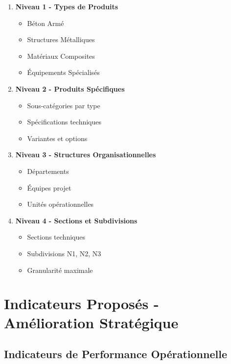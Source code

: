 \documentclass[12pt,a4paper]{article}
\begin{document}
\begin{enumerate}
    \item \textbf{Niveau 1 - Types de Produits}
    \begin{itemize}
        \item Béton Armé
        \item Structures Métalliques
        \item Matériaux Composites
        \item Équipements Spécialisés
    \end{itemize}
    
    \item \textbf{Niveau 2 - Produits Spécifiques}
    \begin{itemize}
        \item Sous-catégories par type
        \item Spécifications techniques
        \item Variantes et options
    \end{itemize}
    
    \item \textbf{Niveau 3 - Structures Organisationnelles}
    \begin{itemize}
        \item Départements
        \item Équipes projet
        \item Unités opérationnelles
    \end{itemize}
    
    \item \textbf{Niveau 4 - Sections et Subdivisions}
    \begin{itemize}
        \item Sections techniques
        \item Subdivisions N1, N2, N3
        \item Granularité maximale
    \end{itemize}
\end{enumerate}

\section{Indicateurs Proposés - Amélioration Stratégique}

\subsection{Indicateurs de Performance Opérationnelle}
\end{document}
